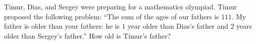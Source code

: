 Timur, Dias, and Sergey were preparing for a mathematics olympiad. Timur proposed the following problem: ``The sum of the ages of our fathers is $111$. My father is older than your fathers: he is $1$ year older than Dias's father and $2$ years older than Sergey's father.'' How old is Timur's father?
